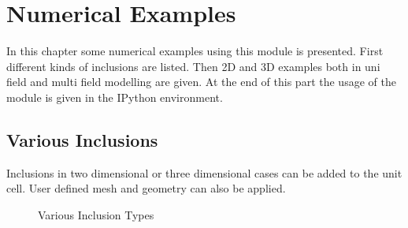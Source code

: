%
%
%
%
%
%

\chapter{Numerical Examples}
In this chapter some numerical examples using this module is presented. First different kinds of inclusions are listed. Then 2D and 3D examples both in uni field and multi field modelling are given. At the end of this part the usage of the module is given in the IPython environment.

\section{Various Inclusions}
Inclusions in two dimensional or three dimensional cases can be added to the unit cell. User defined mesh and geometry can also be applied.

\begin{figure}[h]
  \centering
  \caption{Various Inclusion Types}
  \label{fig: inc} %
\end{figure} 

